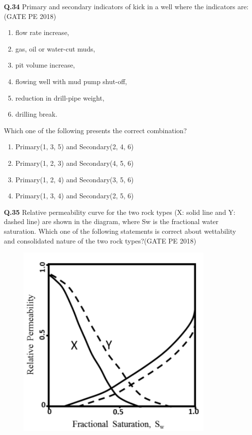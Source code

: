 \documentclass[15pt,a4paper]{article}
\begin{document}
\noindent\textbf{Q.34} Primary and secondary indicators of kick in a well where the indicators are: \hfill (GATE PE 2018)

\begin{enumerate}
\item flow rate increase,
\item gas, oil or water-cut muds,
\item pit volume increase,
\item flowing well with mud pump shut-off,
\item reduction in drill-pipe weight,
\item drilling break.
\end{enumerate}
\noindent
Which one of the following presents the correct combination?


\begin{enumerate}[label=(\Alph*)] 

\item Primary(1, 3, 5) and Secondary(2, 4, 6) 
\item Primary(1, 2, 3) and Secondary(4, 5, 6) 
\item Primary(1, 2, 4) and Secondary(3, 5, 6) 
\item Primary(1, 3, 4) and Secondary(2, 5, 6) 

\end{enumerate}
\pagebreak
\noindent
\textbf{Q.35} Relative permeability curve for the two rock types (X: solid line and Y: dashed line) are
shown in the diagram, where Sw is the fractional water saturation. Which one of the
following statements is correct about wettability and consolidated nature of the two rock
types?\hfill(GATE PE 2018)

\begin{figure}[h!]
  \centering
  \includegraphics[width=0.5\columnwidth]{pic11.png} 
\end{figure}
\end{document}
